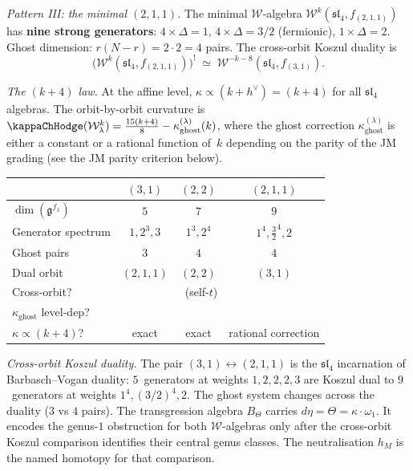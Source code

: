 \begin{construction}
\smallskip
\emph{Pattern III: the minimal $(2,1,1)$.}
The minimal $\mathcal W$-algebra
$\mathcal W^k(\mathfrak{sl}_4,f_{(2,1,1)})$ has \textbf{nine strong
generators}: $4\times\Delta{=}1$, $4\times\Delta{=}3/2$
(fermionic), $1\times\Delta{=}2$.
Ghost dimension: $r(N{-}r)=2\cdot 2=4$ pairs.
The cross-orbit Koszul duality is
\[
\bigl(\mathcal W^k(\mathfrak{sl}_4,f_{(2,1,1)})\bigr)^!
\;\simeq\;
\mathcal W^{-k-8}(\mathfrak{sl}_4,f_{(3,1)}).
\]

\emph{The $(k+4)$ law.}
At the affine level, $\kappa\propto(k+h^\vee)=(k+4)$ for all
$\mathfrak{sl}_4$ algebras. The orbit-by-orbit curvature is
$\kappaChHodge(\mathcal W_\lambda^k)
=\frac{15(k+4)}{8}-\kappa_{\mathrm{ghost}}^{(\lambda)}(k)$,
where the ghost correction $\kappa_{\mathrm{ghost}}^{(\lambda)}$
is either a constant or a rational function of~$k$ depending on
the parity of the JM grading (see the JM parity criterion below).
\begin{center}
\providecommand{\Ymark}{\text{yes}}
\providecommand{\Nmark}{\text{no}}
\renewcommand{\arraystretch}{1.2}
\begin{tabular}{lccc}
& $(3,1)$ & $(2,2)$ & $(2,1,1)$ \\
\hline
$\dim(\mathfrak{g}^{f_\lambda})$ & $5$ & $7$ & $9$ \\
Generator spectrum &
 $1,2^3,3$ &
 $1^3,2^4$ &
 $1^4,\frac{3}{2}^4,2$ \\
Ghost pairs & $3$ & $4$ & $4$ \\
Dual orbit & $(2,1,1)$ & $(2,2)$ & $(3,1)$ \\
Cross-orbit? & \Ymark & \Nmark\ (self-$t$) & \Ymark \\
$\kappa_{\mathrm{ghost}}$ level-dep? & \Nmark & \Nmark & \Ymark \\
$\kappa\propto(k+4)$? & exact & exact & rational correction
\end{tabular}
\end{center}

\emph{Cross-orbit Koszul duality.}
The pair $(3,1)\leftrightarrow(2,1,1)$ is the $\mathfrak{sl}_4$
incarnation of Barbasch--Vogan duality:
$5$~generators at weights $1,2,2,2,3$ are Koszul dual to
$9$~generators at weights $1^4,(3/2)^4,2$.
The ghost system changes across the duality ($3$ vs $4$ pairs).
The transgression algebra $B_\Theta$ carries
$d\eta=\Theta=\kappa\cdot\omega_1$.  It encodes the genus-$1$
obstruction for both $\mathcal W$-algebras only after the
cross-orbit Koszul comparison identifies their central genus classes.
The neutralisation \(h_M\) is the named homotopy for that comparison.


\end{construction}
